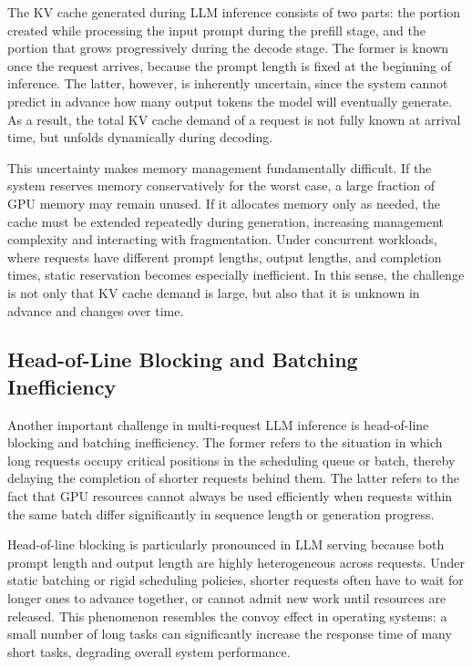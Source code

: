 \documentclass[10pt, a4paper]{article}
\begin{document}
The KV cache generated during LLM inference consists of two parts: the portion
created while processing the input prompt during the prefill stage, and the
portion that grows progressively during the decode stage. The former is known
once the request arrives, because the prompt length is fixed at the beginning of
inference. The latter, however, is inherently uncertain, since the system
cannot predict in advance how many output tokens the model will eventually
generate. As a result, the total KV cache demand of a request is not fully
known at arrival time, but unfolds dynamically during decoding.

This uncertainty makes memory management fundamentally difficult. If the system
reserves memory conservatively for the worst case, a large fraction of GPU
memory may remain unused. If it allocates memory only as needed, the cache must
be extended repeatedly during generation, increasing management complexity and
interacting with fragmentation. Under concurrent workloads, where requests have
different prompt lengths, output lengths, and completion times, static
reservation becomes especially inefficient.\cite{yu2022orca} In this sense, the challenge is not
only that KV cache demand is large, but also that it is unknown in advance and
changes over time.

\subsection{Head-of-Line Blocking and Batching Inefficiency}

Another important challenge in multi-request LLM inference is head-of-line
blocking and batching inefficiency. The former refers to the situation in which
long requests occupy critical positions in the scheduling queue or batch,
thereby delaying the completion of shorter requests behind them. The latter
refers to the fact that GPU resources cannot always be used efficiently when
requests within the same batch differ significantly in sequence length or
generation progress.

Head-of-line blocking is particularly pronounced in LLM serving because both
prompt length and output length are highly heterogeneous across requests. Under
static batching or rigid scheduling policies, shorter requests often have to
wait for longer ones to advance together, or cannot admit new work until
resources are released. This phenomenon resembles the convoy effect in
operating systems: a small number of long tasks can significantly increase the
response time of many short tasks, degrading overall system performance.
\end{document}
